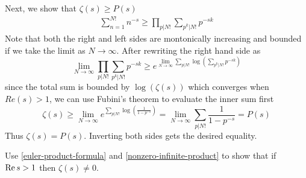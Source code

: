 \documentclass{homework}
\begin{document}
\begin{solution}
                                                                                    Next, we show that $\zeta(s)\geq P(s)$
                                                                                    \begin{align*}
                                                                                    \sum_{n=1}^{N!} n^{-s} \geq \prod_{p|N!}\sum_{p^k|N!} p^{-sk}
                                                                                    \end{align*}
                                                                                    Note that both the right and left sides are montonically increasing and bounded if we take the limit as $N\to\infty$. After rewriting the right hand side as 
                                                                                    \[
                                                                                    \lim_{N\to\infty} \prod_{p|N!}\sum_{p^k|N!} p^{-sk} \geq  e^{\lim_{N\to\infty}\sum_{p|N!} \log(\sum_{p^k|N!} p^{-sk} )}
                                                                                    \]
                                                                                    since the total sum is bounded by $\log(\zeta(s))$ which converges when $Re(s)>1$, we can use Fubini's theorem to evaluate the inner sum first
                                                                                    \[
                                                                                    \zeta(s)\geq \lim_{N\to \infty} e^{\sum_{p|N!} \log(\frac{1}{1 - p^{-s}})} =  \lim_{N\to \infty} \sum_{p|N!} \frac{1}{1 - p^{-s}} = P(s)
                                                                                    \]
                                                                                    Thus $\zeta(s) = P(s)$. Inverting both sides gets the desired equality.
                                                                                    \end{solution}
                                                                                    \begin{problem}
                                                                                      Use \ref{euler-product-formula} and \ref{nonzero-infinite-product}
                                                                                        to show that if $\operatorname{Re} s > 1$ then $\zeta(s) \neq 0$.
                                                                                        \end{problem}
\end{document}
